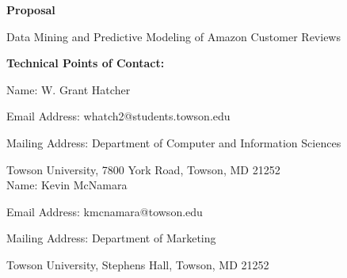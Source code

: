 \documentclass[12pt]{article}
\begin{document}

\begin{center}
	\Large{\bfseries Proposal }\\[18pt]
\end{center}

\begin{flushleft}

	\begin{center}
		\Large Data Mining and Predictive Modeling of Amazon Customer Reviews\\[30pt]
	\end{center}


	\item{\bfseries Technical Points of Contact:}

		\hspace{4ex} Name: W. Grant Hatcher
		
		\hspace{4ex} Email Address: whatch2@students.towson.edu
		
		\hspace{4ex} Mailing Address: Department of Computer and Information Sciences
		
		\hspace{22ex} Towson University, 7800 York Road, Towson, MD 21252
		\\[11pt]
 
 
		 \hspace{4ex} Name: Kevin McNamara
		 
		 \hspace{4ex} Email Address: kmcnamara@towson.edu
		 
		 \hspace{4ex} Mailing Address: Department of Marketing
		 
		 \hspace{22ex} Towson University, Stephens Hall, Towson, MD 21252
		 \\[11pt]
 

\end{flushleft}
\end{document}
